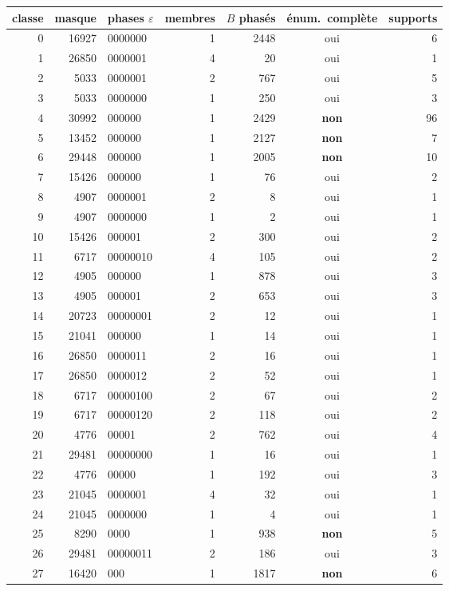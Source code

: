 \begin{longtable}{rrlrrcr}\toprule classe & masque & phases $\varepsilon$ & membres & $B$ phas\'es & \'enum.\ compl\`ete & supports\\\midrule\endhead
0 & 16927 & 0000000 & 1 & 2448 & oui & 6\\
1 & 26850 & 0000001 & 4 & 20 & oui & 1\\
2 & 5033 & 0000001 & 2 & 767 & oui & 5\\
3 & 5033 & 0000000 & 1 & 250 & oui & 3\\
4 & 30992 & 000000 & 1 & 2429 & \textbf{non} & 96\\
5 & 13452 & 000000 & 1 & 2127 & \textbf{non} & 7\\
6 & 29448 & 000000 & 1 & 2005 & \textbf{non} & 10\\
7 & 15426 & 000000 & 1 & 76 & oui & 2\\
8 & 4907 & 0000001 & 2 & 8 & oui & 1\\
9 & 4907 & 0000000 & 1 & 2 & oui & 1\\
10 & 15426 & 000001 & 2 & 300 & oui & 2\\
11 & 6717 & 00000010 & 4 & 105 & oui & 2\\
12 & 4905 & 000000 & 1 & 878 & oui & 3\\
13 & 4905 & 000001 & 2 & 653 & oui & 3\\
14 & 20723 & 00000001 & 2 & 12 & oui & 1\\
15 & 21041 & 000000 & 1 & 14 & oui & 1\\
16 & 26850 & 0000011 & 2 & 16 & oui & 1\\
17 & 26850 & 0000012 & 2 & 52 & oui & 1\\
18 & 6717 & 00000100 & 2 & 67 & oui & 2\\
19 & 6717 & 00000120 & 2 & 118 & oui & 2\\
20 & 4776 & 00001 & 2 & 762 & oui & 4\\
21 & 29481 & 00000000 & 1 & 16 & oui & 1\\
22 & 4776 & 00000 & 1 & 192 & oui & 3\\
23 & 21045 & 0000001 & 4 & 32 & oui & 1\\
24 & 21045 & 0000000 & 1 & 4 & oui & 1\\
25 & 8290 & 0000 & 1 & 938 & \textbf{non} & 5\\
26 & 29481 & 00000011 & 2 & 186 & oui & 3\\
27 & 16420 & 000 & 1 & 1817 & \textbf{non} & 6\\

\end{longtable}
